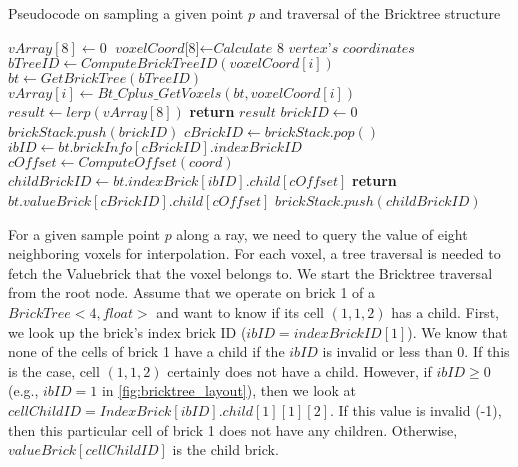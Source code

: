 \begin{algorithm}
	\caption{Pseudocode on sampling a given point $p$ and traversal of the Bricktree structure }\label{alg:sample}
	\begin{algorithmic}[1]
        	\State $vArray[8]\gets \textit{0}$
            \State $\textit{voxelCoord[8]} \gets \textit{Calculate 8 vertex's coordinates}$
            	\State $bTreeID \gets ComputeBrickTreeID(voxelCoord[i])$
                \State $bt \gets GetBrickTree(bTreeID)$
            	\State $vArray[i] \gets Bt\_Cplus\_GetVoxels(bt,voxelCoord[i])$
            	\EndWhile
            \State $result \gets lerp(vArray[8])$
            \State \textbf{return} $result$
    	\EndProcedure
        	\State $brickID\gets \textit{0}$
            \State $brickStack.push(brickID)$
            	\State $cBrickID \gets brickStack.pop()$
                \State $ibID \gets bt.brickInfo[cBrickID].indexBrickID$
            	\State $cOffset \gets ComputeOffset(coord)$
                \State $childBrickID \gets bt.indexBrick[ibID].child[cOffset]$
                	\State \textbf{return} $bt.valueBrick[cBrickID].child[cOffset]$
                \Else
                	\State $brickStack.push(childBrickID)$
                \EndIf
            \EndWhile
    	\EndProcedure
	\end{algorithmic}
\end{algorithm}

For a given sample point $p$ along a ray, we need to query the value of eight
neighboring voxels for interpolation. For each voxel, a tree traversal
is needed to fetch the Valuebrick that the voxel belongs to. We start the Bricktree
traversal from the root node. Assume that we operate on brick 1 of a 
$BrickTree<4,float>$ and want to know if its cell $(1,1,2)$ has a child.
First, we look up the brick's index brick ID ($ibID = indexBrickID[1]$).
We know that none of the cells of brick 1 have a child if the $ibID$
is invalid or less than 0. If this is the case, cell $(1,1,2)$ certainly does not have a child.
However, if $ibID \geq 0$ (e.g., $ibID = 1$ in \autoref{fig:bricktree_layout}), 
then we look at $cellChildID = IndexBrick[ibID].child[1][1][2]$. 
If this value is invalid (-1), then this particular cell of brick 1 does not have any
children. Otherwise, $valueBrick[cellChildID]$ is the child brick.

